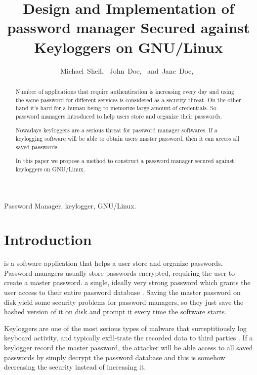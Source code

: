 \documentclass[journal]{IEEEtran}
\begin{document}
\title{Design and Implementation of password manager Secured against Keyloggers on GNU/Linux}

\author{Michael~Shell,~
    John~Doe,~
    and~Jane~Doe,~}



\maketitle


\begin{abstract}
Number of applications that require authentication is increasing every day and using the same password for different services is considered as a security threat. On the other hand it's hard for a human being to memorize large amount of credentials. So password managers introduced to help users store and organize their passwords.

Nowadays keyloggers are a serious threat for password manager softwares. If a keylogging software will be able to obtain users master password, then it can access all saved passwords.

In this paper we propose a method to construct a password manager secured against keyloggers on GNU/Linux.
\end{abstract}

\begin{IEEEkeywords}
Password Manager, keylogger, GNU/Linux.
\end{IEEEkeywords}



\IEEEpeerreviewmaketitle



\section{Introduction}
	
 is a software application that helps a user store and organize passwords. Password managers usually store passwords encrypted, requiring the user to create a master password. a single, ideally very strong password which grants the user access to their entire password database \cite{wiki:passman}. Saving the master password on disk yield some security problems for password managers, so they just save the hashed version of it on disk and prompt it every time the software starts.

Keyloggers are one of the most serious types of malware that surreptitiously log keyboard activity, and typically exfil-trate the recorded data to third parties \cite{holz2009learning}. If a keylogger record the master password, the attacker will be able access to all saved passwords by simply decrypt the password database and this is somehow decreasing the security instead of increasing it. 
\end{document}
